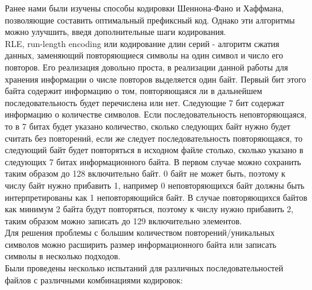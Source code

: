 \documentclass[a4paper,14pt]{extarticle}
\begin{document}
Ранее нами были изучены способы кодировки Шеннона-Фано и Хаффмана, позволяющие составить
оптимальный префиксный код. Однако эти алгоритмы можно улучшить, введя дополнительные 
шаги кодирования. \\
RLE, run-length encoding или кодирование длин серий - алгоритм сжатия данных, заменяющий 
повторяющиеся символы на один символ и число его повторов. Его реализация довольно проста, 
в реализации данной работы для хранения информации о числе повторов выделяется один байт. 
Первый бит этого байта содержит информацию о том, повторяющаяся ли в дальнейшем последовательность
будет перечислена или нет. Следующие 7 бит содержат информацию о количестве символов. Если
последовательность неповторяющаяся, то в 7 битах будет указано количество, сколько следующих байт
нужно будет считать без повторений, если же следует последовательность повторяющаяся, то следующий байт
будет повторяться в исходном файле столько, сколько указано в следующих 7 битах информационного байта.
В первом случае можно сохранить таким образом до 128 включительно байт. 0 байт не может быть, поэтому 
к числу байт нужно прибавить 1, например 0 неповторяющихся байт должны быть интерпретированы как 1 неповторяющийся 
байт. В случае повторяющихся байтов как минимум 2 байта будут повторяться, поэтому к числу нужно прибавить
2, таким образом можно записать до 129 включительно элементов.\\
Для решения проблемы с большим количеством повторений/уникальных символов можно расширить 
размер информационного байта или записать символы в несколько подходов.\\
Были проведены несколько испытаний для различных последовательностей файлов с различными комбинациями кодировок:
\end{document}
